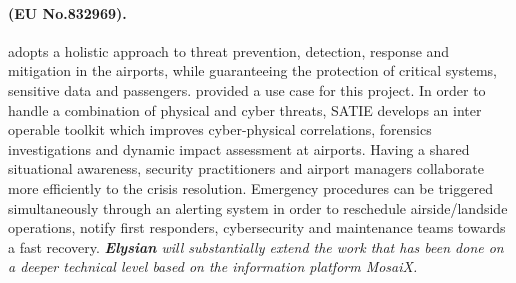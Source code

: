 \documentclass[a4paper,11pt]{article}
\newcommand{\project}[1]{\textbf{#1}\xspace}
\newcommand{\SECURITY}{\project{Elysian}}
\newcommand{\TheProject}{\SECURITY}
\begin{document}

\begin{mdframed}[backgroundcolor=blue!5]
\paragraph{\satie (EU No.832969).}
\satie adopts a holistic approach to threat prevention, detection, response and mitigation in the airports, while guaranteeing the protection of critical systems, sensitive data and passengers. \FRQshort{} provided a use case for this project.  In order to handle a combination of physical and cyber threats, SATIE develops an inter operable toolkit which improves cyber-physical correlations, forensics investigations and dynamic impact assessment at airports. Having a shared situational awareness, security practitioners and airport managers collaborate more efficiently to the crisis resolution. Emergency procedures can be triggered simultaneously through an alerting system in order to reschedule airside/landside operations, notify first responders, cybersecurity and maintenance teams towards a fast recovery.
\emph{\TheProject will substantially extend the work that has been done on a deeper technical level based on the information platform MosaiX.}
\end{mdframed}
\end{document}

